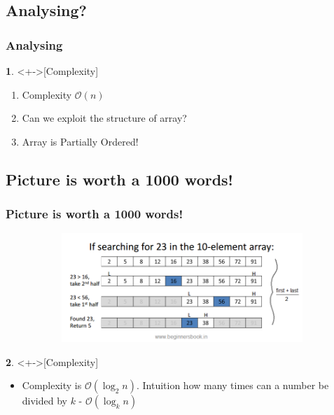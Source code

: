 \documentclass[mathserif,notheorems]{beamer} %
\newcommand{\Olo}{$\mathcal{O}(\log_{2}n)$}
\theoremstyle{plain} %
\theoremstyle{definition} %
\newtheorem*{definition}{}%
\begin{document}
\subsection{Analysing?}
\begin{frame}
\frametitle{Analysing}
\begin{definition}<+->[Complexity]
\begin{enumerate}
	\item Complexity $\mathcal{O}(n)$
	\item Can we exploit the structure of array?
	\item Array is Partially Ordered!
\end{enumerate}
\end{definition}
\end{frame}

\subsection{Picture is worth a 1000 words!}
\begin{frame}
\frametitle{Picture is worth a 1000 words!}
\begin{figure}[!htb]
	\begin{subfigure}{\textwidth}
		\centering
		\includegraphics[width=1\textwidth]{binary-search-algorithm.png}
	\end{subfigure}
\end{figure}

\begin{definition}<+->[Complexity]
	\begin{itemize}
		\item Complexity is \Olo. Intuition how many times can a number be divided by $k$ - $\mathcal{O}(\log_{k} {n})$
	\end{itemize}
\end{definition}
\end{frame}
\end{document}
